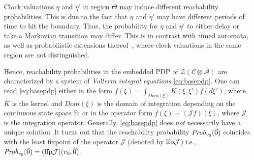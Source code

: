 \documentclass{LMCS}
\newcommand{\mc}[1]{\mathcal{#1}}
\newcommand{\mb}{\mathbb}
\newcommand{\<}{\langle}
\renewcommand{\>}{\rangle}
\newcommand{\mC}{\mathcal{C}}
\newcommand{\mA}{\mathcal{A}}
\newcommand{\Prob}{{\it Prob}}
\begin{document}
\begin{rem}
Clock valuations $\eta$ and $\eta'$ in region $\Theta$ may induce different
reachability probabilities.  This is due to the fact that $\eta$ and $\eta'$ may
have different periods of time to hit the boundary,  Thus, the probability for
$\eta$ and $\eta'$ to either delay or take a Markovian transition may differ.
This is in contrast with timed automata, as well as probabilistic extensions
thereof~\emph{\cite{KNSS02}}, where clock valuations in the same region are
not distinguished.
\end{rem}

Hence, reachability probabilities in the embedded PDP of $\mc{Z}(\mC \otimes \mA)$
are characterized by a system of \emph{Volterra integral equations} \eqref{eq:basepdp}.
One can read \eqref{eq:basepdp} either in the form $f(\xi)=\int_{Dom(\xi)}K(\xi,\xi')f(d\xi')$,
where $K$ is the kernel and $Dom(\xi)$ is the domain of integration depending on
the continuous state space $\mb{S}$; or in the operator form $f(\xi)=(\mc{J}\!f)(\xi)$, where
$\mc{J}$ is the integration operator.  Generally, \eqref{eq:basepdp} does \emph{not}
necessarily have a unique solution.  It turns out that the reachability probability ${\Prob}_{v_0}
(\vec{0})$ coincides with the least fixpoint of the operator $\mc{J}$ (denoted by ${\rm
lfp}\mc{J}$) i.e., ${\Prob}_{v_0}(\vec{0}) = ({\rm lfp}\mc{J})(v_0,\vec{0})$.
\end{document}
